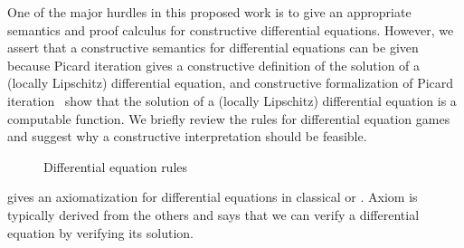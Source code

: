 \documentclass[12pt]{cmuthesis}
\theoremstyle{definition}
\theoremstyle{remark}
\newcommand{\rref}[2][]{\prettyref{#2}}
\newcommand{\lequiv}{\leftrightarrow}
\begin{document}
One of the major hurdles in this proposed work is to give an appropriate semantics and proof calculus for constructive differential equations.
However, we assert that a constructive semantics for differential equations can be given because Picard iteration gives a constructive definition of the solution of a (locally Lipschitz) differential equation, and constructive formalization of Picard iteration~\cite{Krebbers+Spitters:lmcs:corn:2011} show that the solution of a (locally Lipschitz) differential equation is a computable function.
We briefly review the \dGL rules for differential equation games and suggest why a constructive interpretation should be feasible.
\begin{figure}
  \centering
  \begin{calculuscollections}{\columnwidth}
    \begin{calculus}
{
}{}
\cinferenceRule[dglweak|DW]{}
{
}{}
\cinferenceRule[dglcut|DC]{}
{
\linferenceRule[lpmi]{(\dbox{\pevolvein{\D{x}=f}{\psi}}{\phi}\lequiv \dbox{\pevolvein{\D{x}=f}{\psi \land \rho}}{\phi})}{\dbox{\pevolvein{\D{x}=f}{\psi}}{\rho}}
}{}
\cinferenceRule[dglind|DI]{}
{
}{}
\cinferenceRule[dglghost|DG]{}
{
}{}
\cinferenceRule[dglconst|DS]{}
{
}{}
\cinferenceRule[dglvariant|DV]{}
{
}{}
\end{calculus}
\end{calculuscollections}
\caption{Differential equation rules}
\label{fig:diffeq-rules}
\end{figure}
\rref{fig:diffeq-rules} gives an axiomatization for differential equations in classical \dL or \dGL.
Axiom  is typically derived from the others and says that we can verify a differential equation by verifying its solution.
\end{document}
